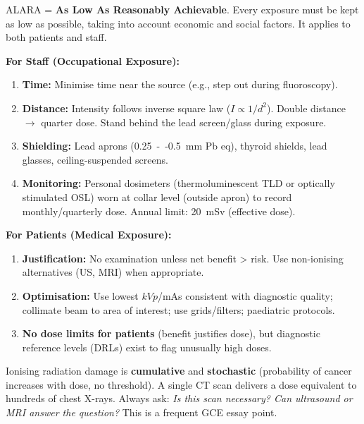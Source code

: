 \documentclass[11pt]{article}
\newcommand{\cle}[1]{{\popxbold\color{popdark}#1}}
\begin{document}
\begin{propriete}
\cle{ALARA} = \textbf{As Low As Reasonably Achievable}. Every exposure must be kept as low as possible, taking into account economic and social factors. It applies to both patients and staff.
\end{propriete}

\begin{methode}
\textbf{For Staff (Occupational Exposure):}
\begin{enumerate}
    \item \textbf{Time:} Minimise time near the source (e.g., step out during fluoroscopy).
    \item \textbf{Distance:} Intensity follows inverse square law ($I \propto 1/d^2$). Double distance $\to$ quarter dose. Stand behind the lead screen/glass during exposure.
    \item \textbf{Shielding:} Lead aprons (\SI{0.25}{--}\SI{0.5}{mm} Pb eq), thyroid shields, lead glasses, ceiling-suspended screens.
    \item \textbf{Monitoring:} Personal dosimeters (thermoluminescent TLD or optically stimulated OSL) worn at collar level (outside apron) to record monthly/quarterly dose. Annual limit: \SI{20}{mSv} (effective dose).
\end{enumerate}
\textbf{For Patients (Medical Exposure):}
\begin{enumerate}
    \item \textbf{Justification:} No examination unless net benefit > risk. Use non-ionising alternatives (US, MRI) when appropriate.
    \item \textbf{Optimisation:} Use lowest $kVp$/mAs consistent with diagnostic quality; collimate beam to area of interest; use grids/filters; paediatric protocols.
    \item \textbf{No dose limits for patients} (benefit justifies dose), but diagnostic reference levels (DRLs) exist to flag unusually high doses.
\end{enumerate}
\end{methode}

\begin{attention}
Ionising radiation damage is \textbf{cumulative} and \textbf{stochastic} (probability of cancer increases with dose, no threshold). A single CT scan delivers a dose equivalent to hundreds of chest X-rays. Always ask: \emph{Is this scan necessary? Can ultrasound or MRI answer the question?} This is a frequent GCE essay point.
\end{attention}
\end{document}
